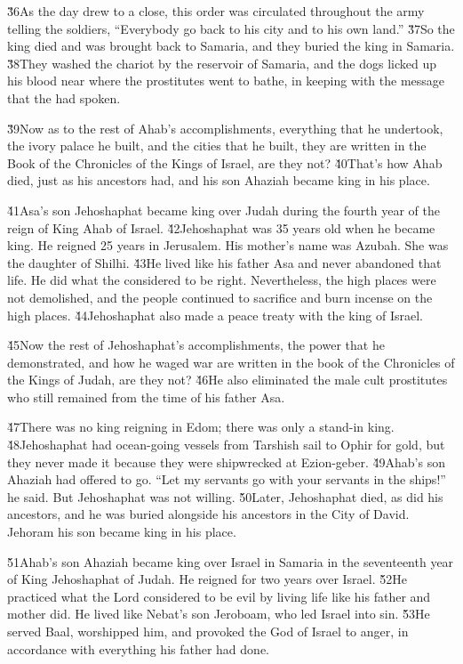 \v{36}As the day drew to a close, this order was circulated throughout the army telling the soldiers, ``Everybody go back to his city and to his own land.'' \v{37}So the king died and was brought back to Samaria, and they buried the king in Samaria. \v{38}They washed the chariot by the reservoir of Samaria, and the dogs licked up his blood near where the prostitutes went to bathe, in keeping with the message that the  had spoken.

\v{39}Now as to the rest of Ahab's accomplishments, everything that he undertook, the ivory palace he built, and the cities that he built, they are written in the Book of the Chronicles of the Kings of Israel, are they not? \v{40}That's how Ahab died, just as his ancestors had, and his son Ahaziah became king in his place.

\v{41}Asa's son Jehoshaphat became king over Judah during the fourth year of the reign of King Ahab of Israel. \v{42}Jehoshaphat was 35 years old when he became king. He reigned 25 years in Jerusalem. His mother's name was Azubah. She was the daughter of Shilhi. \v{43}He lived like his father Asa and never abandoned that life. He did what the  considered to be right. Nevertheless, the high places were not demolished, and the people continued to sacrifice and burn incense on the high places. \v{44}Jehoshaphat also made a peace treaty with the king of Israel.

\v{45}Now the rest of Jehoshaphat's accomplishments, the power that he demonstrated, and how he waged war are written in the book of the Chronicles of the Kings of Judah, are they not? \v{46}He also eliminated the male cult prostitutes who still remained from the time of his father Asa.

\v{47}There was no king reigning in Edom; there was only a stand-in king. \v{48}Jehoshaphat had ocean-going vessels from Tarshish sail to Ophir for gold, but they never made it because they were shipwrecked at Ezion-geber. \v{49}Ahab's son Ahaziah had offered to go. ``Let my servants go with your servants in the ships!'' he said. But Jehoshaphat was not willing. \v{50}Later, Jehoshaphat died, as did his ancestors, and he was buried alongside his ancestors in the City of David. Jehoram his son became king in his place.

\v{51}Ahab's son Ahaziah became king over Israel in Samaria in the seventeenth year of King Jehoshaphat of Judah. He reigned for two years over Israel. \v{52}He practiced what the Lord considered to be evil by living life like his father and mother did. He lived like Nebat's son Jeroboam, who led Israel into sin. \v{53}He served Baal, worshipped him, and provoked the  God of Israel to anger, in accordance with everything his father had done.
